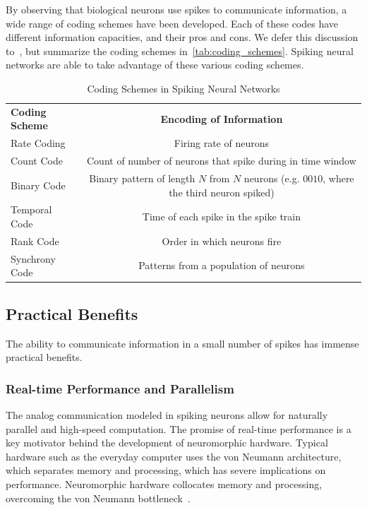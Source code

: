 \documentclass[fyp]{socreport}
\begin{document}
By observing that biological neurons use spikes to communicate information, a
wide range of coding schemes have been developed. Each of these codes have
different information capacities, and their pros and cons. We defer this
discussion to~\cite{thorpe2001spike}, but summarize the coding schemes
in~\autoref{tab:coding_schemes}. Spiking neural networks are able to take
advantage of these various coding schemes.

\begin{table}
  \centering
  \small
  \begin{tabular}{l|c}
    \hline
    \hline
    \textbf{Coding Scheme} & \textbf{Encoding of Information} \\
    Rate Coding & Firing rate of neurons \\
    Count Code & Count of number of neurons that spike during in time window \\
    Binary Code & Binary pattern of length $N$ from $N$ neurons (e.g. $0010$,
                  where the third neuron spiked) \\
    Temporal Code & Time of each spike in the spike
                    train \\
    Rank Code & Order in which neurons fire \\
    Synchrony Code & Patterns from a population of neurons \\
    \hline
    \hline
  \end{tabular}
  \normalsize
  \caption{Coding Schemes in Spiking Neural Networks}
  \label{tab:coding_schemes}
\end{table}

\subsection{Practical Benefits}

The ability to communicate information in a small number of spikes has immense
practical benefits.

\subsubsection{Real-time Performance and Parallelism}

The analog communication modeled in spiking neurons allow for naturally parallel
and high-speed computation. The promise of real-time performance is a key
motivator behind the development of neuromorphic hardware. Typical hardware such
as the everyday computer uses the von Neumann architecture, which separates
memory and processing, which has severe implications on performance.
Neuromorphic hardware collocates memory and processing, overcoming the von
Neumann bottleneck~\cite{Backus_1978}.
\end{document}
